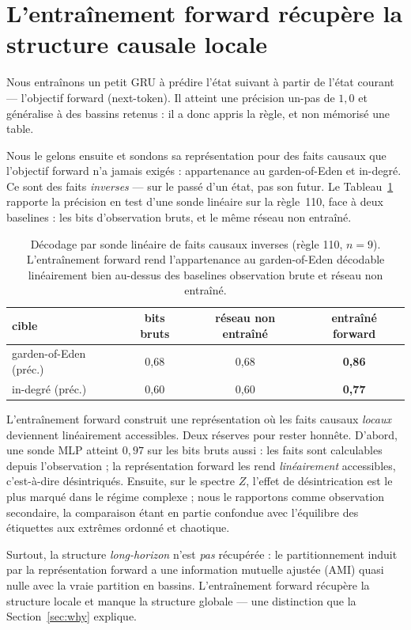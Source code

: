 \documentclass[11pt]{article}
\begin{document}
\section{L'entraînement forward récupère la structure causale locale}
\label{sec:local}

Nous entraînons un petit GRU à prédire l'état suivant à partir de l'état
courant --- l'objectif forward (next-token). Il atteint une précision un-pas de
$1{,}0$ et généralise à des bassins retenus : il a donc appris la règle, et non
mémorisé une table.

Nous le gelons ensuite et sondons sa représentation pour des faits causaux que
l'objectif forward n'a jamais exigés : appartenance au garden-of-Eden et
in-degré. Ce sont des faits \emph{inverses} --- sur le passé d'un état, pas son
futur. Le Tableau~\ref{tab:probe} rapporte la précision en test d'une sonde
linéaire sur la règle~110, face à deux baselines : les bits d'observation
bruts, et le même réseau non entraîné.

\begin{table}[h]
\centering
\caption{Décodage par sonde linéaire de faits causaux inverses (règle 110,
$n{=}9$). L'entraînement forward rend l'appartenance au garden-of-Eden
décodable linéairement bien au-dessus des baselines observation brute et
réseau non entraîné.}
\label{tab:probe}
\begin{tabular}{lccc}
\toprule
cible & bits bruts & réseau non entraîné & entraîné forward \\
\midrule
garden-of-Eden (préc.) & 0,68 & 0,68 & \textbf{0,86} \\
in-degré (préc.)       & 0,60 & 0,60 & \textbf{0,77} \\
\bottomrule
\end{tabular}
\end{table}

L'entraînement forward construit une représentation où les faits causaux
\emph{locaux} deviennent linéairement accessibles. Deux réserves pour rester
honnête. D'abord, une sonde MLP atteint $0{,}97$ sur les bits bruts aussi : les
faits sont calculables depuis l'observation ; la représentation forward les
rend \emph{linéairement} accessibles, c'est-à-dire désintriqués. Ensuite, sur
le spectre $Z$, l'effet de désintrication est le plus marqué dans le régime
complexe ; nous le rapportons comme observation secondaire, la comparaison
étant en partie confondue avec l'équilibre des étiquettes aux extrêmes ordonné
et chaotique.

Surtout, la structure \emph{long-horizon} n'est \emph{pas} récupérée : le
partitionnement induit par la représentation forward a une information mutuelle
ajustée (AMI) quasi nulle avec la vraie partition en bassins. L'entraînement
forward récupère la structure locale et manque la structure globale --- une
distinction que la Section~\ref{sec:why} explique.
\end{document}
